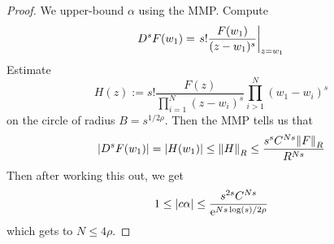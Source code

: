 \documentclass[../notes.tex]{subfiles}
\begin{document}
\begin{itemize}
\begin{proof}
        We upper-bound $\alpha$ using the MMP. Compute
        \begin{equation*}
            D^sF(w_1) = \eval{s!\frac{F(w_1)}{(z-w_1)^s}}_{z=w_1}
        \end{equation*}
        Estimate
        \begin{equation*}
            H(z) := s!\frac{F(z)}{\prod_{i=1}^N(z-w_i)^s}\prod_{i>1}^N(w_1-w_i)^s
        \end{equation*}
        on the circle of radius $B=s^{1/2\rho}$. Then the MMP tells us that
        \begin{equation*}
            |D^sF(w_1)| = |H(w_1)|
            \leq \norm{H}_R
            \leq \frac{s^sC^{Ns}\norm{F}_R}{R^{Ns}}
        \end{equation*}
        Then after working this out, we get
        \begin{equation*}
            1 \leq |c\alpha|
            \leq \frac{s^{2s}C^{Ns}}{\e[Ns\log(s)/2\rho]}
        \end{equation*}
        which gets to $N\leq 4\rho$.
    \end{proof}
\end{itemize}
\end{document}
